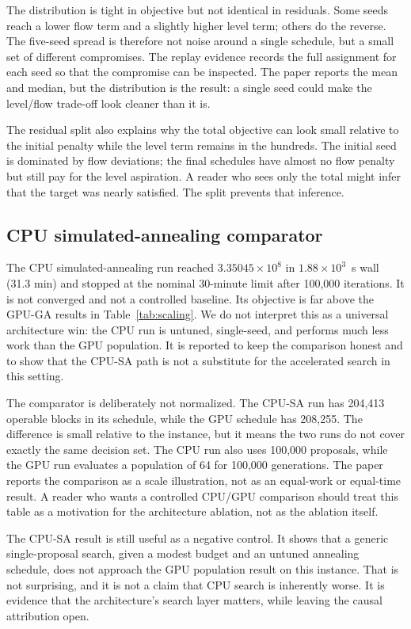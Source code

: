 \documentclass[11pt]{article}
\begin{document}
The distribution is tight in objective but not identical in residuals. Some seeds reach a lower flow
term and a slightly higher level term; others do the reverse. The five-seed spread is therefore not
noise around a single schedule, but a small set of different compromises. The replay evidence records
the full assignment for each seed so that the compromise can be inspected. The paper reports the
mean and median, but the distribution is the result: a single seed could make the level/flow trade-off
look cleaner than it is.

The residual split also explains why the total objective can look small relative to the initial
penalty while the level term remains in the hundreds. The initial seed is dominated by flow deviations;
the final schedules have almost no flow penalty but still pay for the level aspiration. A reader who
sees only the total might infer that the target was nearly satisfied. The split prevents that
inference.



\subsection{CPU simulated-annealing comparator}

The CPU simulated-annealing run reached $3.35045\times10^8$ in $1.88\times10^3$~s wall
(31.3 min) and stopped at the nominal 30-minute limit after 100,000 iterations. It is not converged and
not a controlled baseline. Its objective is far above the GPU-GA results in
Table~\ref{tab:scaling}. We do not interpret this as a universal architecture
win: the CPU run is untuned, single-seed, and performs much less work than the
GPU population. It is reported to keep the comparison honest and to show that
the CPU-SA path is not a substitute for the accelerated search in this setting.

The comparator is deliberately not normalized. The CPU-SA run has 204,413 operable blocks in its
schedule, while the GPU schedule has 208,255. The difference is small relative to the instance, but it
means the two runs do not cover exactly the same decision set. The CPU run also uses 100,000 proposals,
while the GPU run evaluates a population of 64 for 100,000 generations. The paper reports the
comparison as a scale illustration, not as an equal-work or equal-time result. A reader who wants a
controlled CPU/GPU comparison should treat this table as a motivation for the architecture ablation,
not as the ablation itself.

The CPU-SA result is still useful as a negative control. It shows that a generic single-proposal
search, given a modest budget and an untuned annealing schedule, does not approach the GPU population
result on this instance. That is not surprising, and it is not a claim that CPU search is inherently
worse. It is evidence that the architecture's search layer matters, while leaving the causal
attribution open.
\end{document}
